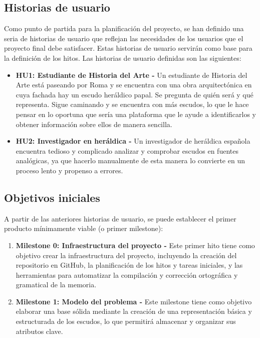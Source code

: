 \subsection{Historias de usuario} \label{sec:historias_usuario}
Como punto de partida para la planificación del proyecto, se han definido una seria de 
historias de usuario que reflejan las necesidades de los usuarios que el proyecto final
debe satisfacer. Estas historias de usuario servirán como base para la definición de los hitos.
Las historias de usuario definidas son las siguientes:
\begin{itemize}
    \item \textbf{HU1: Estudiante de Historia del Arte - }Un estudiante de Historia del 
    Arte está paseando por Roma y se encuentra con una obra arquitectónica en cuya fachada
    hay un escudo heráldico papal. Se pregunta de quién será y qué representa. Sigue caminando 
    y se encuentra con más escudos, lo que le hace pensar en lo oportuna que sería una 
    plataforma que le ayude a identificarlos y obtener información sobre ellos de manera 
    sencilla.
    \item \textbf{HU2: Investigador en heráldica - }Un investigador de heráldica española
    encuentra tedioso y complicado analizar y comprobar escudos en fuentes analógicas, ya 
    que hacerlo manualmente de esta manera lo convierte en un proceso lento y propenso a 
    errores.
\end{itemize}

\subsection{Objetivos iniciales}
A partir de las anteriores historias de usuario, se puede establecer el primer
producto mínimamente viable (o primer milestone):
\begin{enumerate}
    \item \textbf{Milestone 0: Infraestructura del proyecto - }Este primer hito tiene como 
    objetivo crear la infraestructura del proyecto, incluyendo la creación del repositorio
    en GitHub, la planificación de los hitos y tareas iniciales, y las herramientas para automatizar
    la compilación y corrección ortográfica y gramatical de la memoria.
    \item \textbf{Milestone 1: Modelo del problema - }Este milestone tiene como objetivo
    elaborar una base sólida mediante la creación de una representación básica y estructurada
    de los escudos, lo que permitirá almacenar y organizar sus atributos clave.
\end{enumerate}

